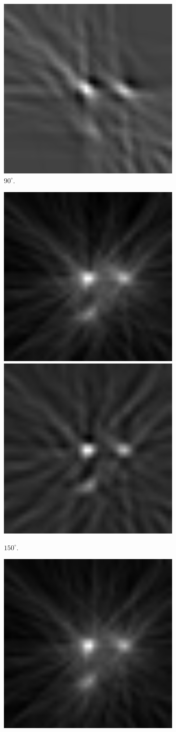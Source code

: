 \documentclass[slug=PET, room=Andreas-Schubert-Bau\,\ 424A,
supervisor=Carsten\ Bittrich, coursedate=10.\ 01.\ 2020, ngerman]{../../Lab_Report_LaTeX/lab_report}
\begin{document}
\begin{figure}[htp]
\begin{subfigure}{0.5\textwidth}
    \includegraphics[width=.4\textwidth]{../messungen/oliTOM1/9_gefiltert.png}
    \caption{\(90^\circ\).}
    \label{eq:tom1-90}
  \end{subfigure}
  \begin{subfigure}{0.5\textwidth}
    \centering
    \includegraphics[width=.4\textwidth]{../messungen/oliTOM1/13_einfach.png}
    \includegraphics[width=.4\textwidth]{../messungen/oliTOM1/13_gefiltert.png}
    \caption{\(150^\circ\).}
    \label{eq:tom1-150}
  \end{subfigure}
  \begin{subfigure}{0.5\textwidth}
    \centering
    \includegraphics[width=.4\textwidth]{../messungen/oliTOM1/15_einfach.png}

\end{subfigure}
\end{figure}
\end{document}
